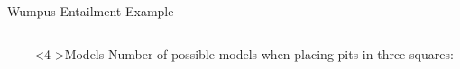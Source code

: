 \documentclass[14pt]{beamer}
\begin{document}
\begin{frame}[label=wumpus-entailment]{Wumpus Entailment Example}
\begin{columns}
\begin{column}{2.5in}
\centering
\begin{wumpusgrid}{3}{0.18\textheight}
\end{wumpusgrid}
\end{column}
\begin{column}{1.5in}
\begin{block}<4->{Models}
Number of possible models when placing pits in three squares: \\
\hspace{1em} 
\end{block}
\end{column}
\end{columns}
\end{frame}
\end{document}
